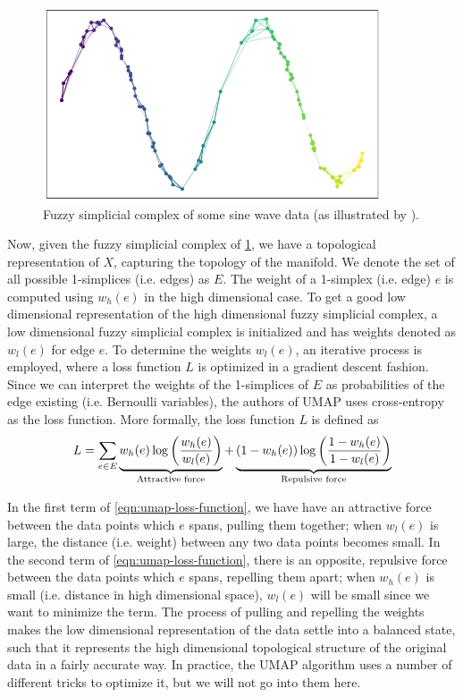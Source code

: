\begin{figure}[H]
    \centering
    \includegraphics[width=10cm]{thesis/figures/how_umap_works_umap_graph.png}
    \caption{Fuzzy simplicial complex of some sine wave data (as illustrated by \cite{how-umap-works-2018}).}
    \label{fig:how_umap_works_umap_graph}
\end{figure}
Now, given the fuzzy simplicial complex of \cref{fig:how_umap_works_umap_graph}, we have a topological representation of $X$, capturing the topology of the manifold. We denote the set of all possible 1-simplices (i.e. edges) as $E$. The weight of a 1-simplex (i.e. edge) $e$ is computed using $w_h(e)$ in the high dimensional case. To get a good low dimensional representation of the high dimensional fuzzy simplicial complex, a low dimensional fuzzy simplicial complex is initialized and has weights denoted as $w_l(e)$ for edge $e$. To determine the weights $w_l(e)$, an iterative process is employed, where a loss function $L$ is optimized in a gradient descent fashion. Since we can interpret the weights of the 1-simplices of $E$ as probabilities of the edge existing (i.e. Bernoulli variables), the authors of UMAP uses cross-entropy as the loss function. More formally, the loss function $L$ is defined as
\begin{align}
    L = \sumlim{e \in E}{} \undertext{w_h(e) \log \enclp{\frac{w_h(e)}{w_l(e)}}}{Attractive force} + \undertext{(1 - w_h(e)) \log \enclp{\frac{1 - w_h(e)}{1 - w_l(e)}}}{Repulsive force}
    \label{eqn:umap-loss-function}
\end{align}

In the first term of \cref{eqn:umap-loss-function}, we have have an attractive force between the data points which $e$ spans, pulling them together; when $w_l(e)$ is large, the distance (i.e. weight) between any two data points becomes small. In the second term of \cref{eqn:umap-loss-function}, there is an opposite, repulsive force between the data points which $e$ spans, repelling them apart; when $w_h(e)$ is small (i.e. distance in high dimensional space), $w_l(e)$ will be small since we want to minimize the term. The process of pulling and repelling the weights makes the low dimensional representation of the data settle into a balanced state, such that it represents the high dimensional topological structure of the original data in a fairly accurate way. In practice, the UMAP algorithm uses a number of different tricks to optimize it, but we will not go into them here.

